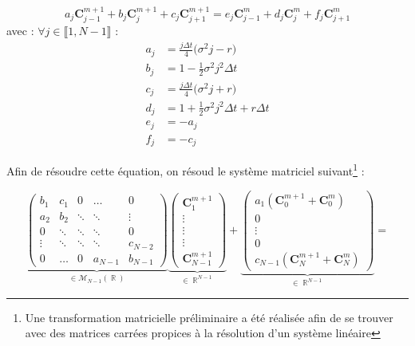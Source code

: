 \documentclass[11pt,a4paper]{article}
\newcommand*{\intval}[2]{\llbracket #1, #2 \rrbracket}
\newcommand*{\C}[2]{\mathbf{C}^{#1}_{#2}}
\theoremstyle{plain}
\DeclareMathOperator{\R}{\mathbb{R}}
\begin{document}
\begin{equation*}
    a_j\C{m + 1}{j - 1} + b_j\C{m + 1}{j} + c_j\C{m + 1}{j + 1} = e_j\C{m}{j - 1} + d_j\C{m}{j} + f_j\C{m}{j + 1} 
\end{equation*}
avec : $\forall j \in \intval{1}{N - 1}$ : 
\begin{align*}
    a_j &= \frac{j\Delta t}{4}\Big(\sigma^2j - r\Big) \\
    b_j &= 1 - \frac{1}{2}\sigma^2j^2\Delta t \\
    c_j &= \frac{j\Delta t}{4}\Big(\sigma^2j + r\Big) \\
    d_j &= 1 + \frac{1}{2}\sigma^2j^2\Delta t + r\Delta t \\
    e_j &= -a_j \\
    f_j &= -c_j
\end{align*}

Afin de résoudre cette équation, on résoud le système matriciel suivant\footnote{Une transformation matricielle préliminaire a été réalisée afin de se trouver avec des matrices carrées propices à la résolution d'un système linéaire} :

$$
\underbrace{\begin{pmatrix}
b_1 & c_1 & 0 & \dots & 0  \\
a_2 & b_2 & \ddots  & \ddots & \vdots  \\
0 & \ddots &\ddots  &\ddots  & 0  \\
\vdots & \ddots & \ddots &\ddots  & c_{N - 2} \\
0 & \dots  & 0  & a_{N - 1} & b_{N - 1} 
\end{pmatrix}}_{\in \mathcal{M}_{N - 1}(\R)}
\underbrace{\begin{pmatrix}
\C{m + 1}{1} \\
\vdots \\
\vdots \\
\vdots \\
\C{m + 1}{N - 1}
\end{pmatrix}}_{\in \R^{N - 1}}
+ 
\underbrace{\begin{pmatrix}
a_{1}(\C{m + 1}{0} + \C{m}{0})\\
0 \\
\vdots \\
0 \\
c_{N - 1}(\C{m + 1}{N} + \C{m}{N})
\end{pmatrix}}_{\in \R^{N - 1}}
=
$$
\end{document}
